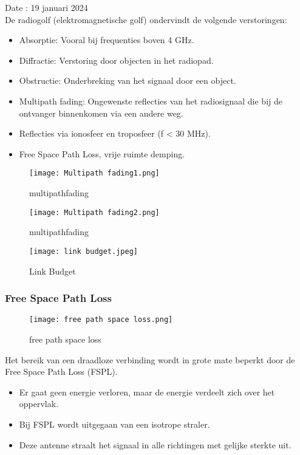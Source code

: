 Date : 19 januari 2024\\

De radiogolf (elektromagnetische golf) ondervindt de volgende verstoringen:
\begin{itemize}
  \item Absorptie: Vooral bij frequenties boven 4 GHz.
  \item Diffractie: Verstoring door objecten in het radiopad.
  \item Obstructie: Onderbreking van het signaal door een object.
  \item Multipath fading: Ongewenste reflecties van het radiosignaal die bij de ontvanger binnenkomen via een andere weg.
  \item Reflecties via ionosfeer en troposfeer (f < 30 MHz).
  \item Free Space Path Loss, vrije ruimte demping.
\end{itemize}

\begin{figure}[H]
    \centering
    \texttt{[image: Multipath fading1.png]}
    \caption{multipathfading}
    \end{figure}

\begin{figure}[H]
    \centering
    \texttt{[image: Multipath fading2.png]}
    \caption{multipathfading}
    \end{figure}

\begin{figure}[H]
    \centering
    \texttt{[image: link budget.jpeg]}
    \caption{Link Budget}
    \end{figure}

\subsubsection{Free Space Path Loss}

\begin{figure}[H]
    \centering
    \texttt{[image: free path space loss.png]}
    \caption{free path space loss}
    \end{figure}

Het bereik van een draadloze verbinding wordt in grote mate beperkt door de Free Space Path Loss (FSPL).
\begin{itemize}
    \item Er gaat geen energie verloren, maar de energie verdeelt zich over het oppervlak.
    \item Bij FSPL wordt uitgegaan van een isotrope straler.
    \item Deze antenne straalt het signaal in alle richtingen met gelijke sterkte uit.
\end{itemize}

